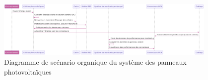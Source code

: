 \documentclass{article}
\begin{document}
\begin{figure}[H]
    \centering
    \includegraphics[width=0.95\textwidth]{diagramme_de_scenario_organique.png}
    \caption{Diagramme de scénario organique du système des panneaux photovoltaïques}
    \label{fig:diagramme_scenario_organique}

\end{figure}


\clearpage





\
\end{document}
